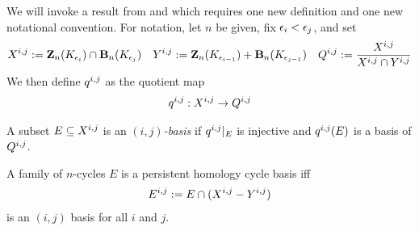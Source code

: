 \documentclass[utf8]{frontiers_suppmat} %
\begin{document}
We will invoke a result from \cite{eirene} and \cite{henselman2017} which requires one new definition and one new notational convention.  For notation, let $n$ be given, fix ${\epsilon_i} < {\epsilon_j}$, and set
    \begin{align*}
        X^{i, j}: = \mathbf{Z}_n(K_{\epsilon_i}) \cap \mathbf{B}_n(K_{\epsilon_j})
        &&
        Y^{i, j}: = \mathbf{Z}_n(K_{\epsilon_{i-1}}) + \mathbf{B}_n(K_{\epsilon_{j-1}})
        &&
        Q^{i,j}: = \frac{X^{i, j}}{X^{i, j} \cap Y^{i, j}}
    \end{align*}
We then define $q^{i, j}$ as the quotient map 
    \begin{align*}
        \qij:   \xij \to \Qij %
    \end{align*}


\begin{definition}
A subset $E \subseteq X^{i, j}$  is an \emph{$(i,j)$-basis} if $q^{i, j}|_E$ is injective and $q^{i, j}(E)$ is a basis of $Q^{i,j}$.  
\end{definition}







\begin{theorem}
\label{thm:phindependencecharacterization}
A family of $n$-cycles $E$ is a persistent homology cycle basis iff
    \begin{align*}
        E^{i,j} := E \cap (X^{i, j} - Y^{i, j})
    \end{align*}
is an $(i,j)$ basis for all $i$ and $j$.
\end{theorem}
\end{document}
